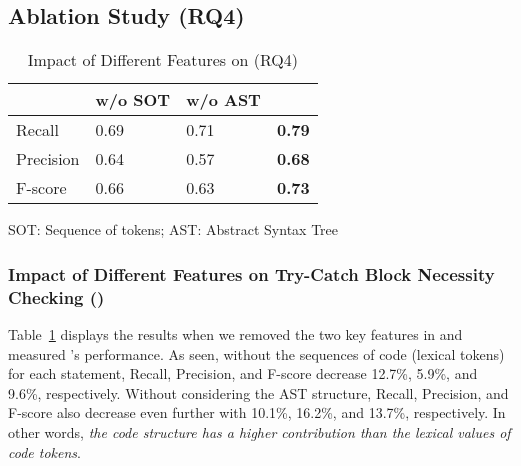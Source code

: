 \subsection{Ablation Study (RQ4)}
\label{sec:rq4}



\begin{table}[t]
  \caption{Impact of Different Features on {\xblock} (RQ4)}
  \vspace{-12pt}
  \begin{center}
    \small
		\renewcommand{\arraystretch}{1}
		\begin{tabular}{p{1.75cm}<{\centering}|p{1.75cm}<{\centering}|p{1.75cm}<{\centering}|p{1.75cm}<{\centering}}
			\hline
			  & \tool w/o SOT & \tool w/o AST & \tool \\
			\hline
			Recall    & 0.69 & 0.71 & \textbf{0.79} \\
			Precision & 0.64 & 0.57 &\textbf{0.68} \\
			F-score   & 0.66 & 0.63 &\textbf{0.73} \\
			\hline
		\end{tabular}
		SOT: Sequence of tokens; AST: Abstract Syntax Tree
		\label{tab:sensi-xblock}
	\end{center}
\end{table}

\subsubsection{Impact of Different Features on Try-Catch Block Necessity Checking ({\xblock})}

Table~\ref{tab:sensi-xblock} displays the results when we removed the
two key features in {\tool} and measured {\xblock}'s performance. As
seen, without the sequences of code (lexical tokens) for each
statement, Recall, Precision, and F-score decrease 12.7\%, 5.9\%, and
9.6\%, respectively. Without considering the AST structure, Recall,
Precision, and F-score also decrease even further with 10.1\%, 16.2\%, and
13.7\%, respectively. In other words, {\em the code structure has a higher
contribution than the lexical values of code tokens}.



